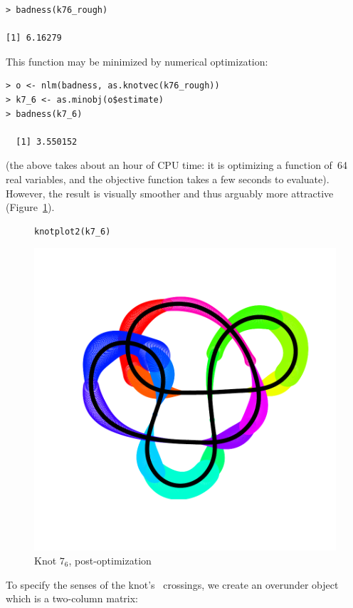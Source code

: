 \documentclass{birkjour}
\theoremstyle{definition}
\theoremstyle{remark}
\numberwithin{equation}{section}
\begin{document}
\begin{verbatim}
> badness(k76_rough)

[1] 6.16279
\end{verbatim}

This function may be minimized by numerical optimization:

\begin{verbatim}
> o <- nlm(badness, as.knotvec(k76_rough))
> k7_6 <- as.minobj(o$estimate)
> badness(k7_6)

  [1] 3.550152
\end{verbatim}

(the above takes about an hour of CPU time: it is optimizing a
function of~64 real variables, and the objective function takes a few
seconds to evaluate).  However, the result is visually smoother and
thus arguably more attractive (Figure~\ref{7_6}).

\begin{figure}[!tbp]
\begin{verbatim}
knotplot2(k7_6)
\end{verbatim}
  \centering
\includegraphics[scale = 0.9]{knot-k76_knotplot2}
\caption{Knot $7_6$, post-optimization\label{7_6}}
\end{figure}
   
To specify the senses of the knot's\ %
crossings, we create an overunder object which is a two-column matrix:
\end{document}
